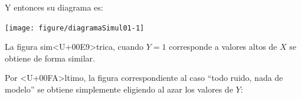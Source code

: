 \documentclass[10pt,a4paper]{article}
\begin{document}
\begin{knitrout}
\color{fgcolor}\begin{kframe}
\begin{alltt}
 \hlkwb{=}  \hlopt{>} \hlstd{,}  \hlstd{=} \hlstd{,}  \hlstd{=} \hlstd{)}
 \hlkwb{=}   
\end{alltt}
\end{kframe}
\end{knitrout}
Y entonces su diagrama es:
\begin{knitrout}
\color{fgcolor}\begin{kframe}
\begin{alltt}
 \hlkwb{=} \hlstd{()}
\hlstd{colores[datosSimul01}\hlopt{$} \hlopt{==} \hlstd{]} \hlkwb{=} 
\hlstd{colores[datosSimul01}\hlopt{$} \hlopt{==} \hlstd{]} \hlkwb{=} 
\hlopt{$}\hlopt{$}  \hlstd{=} \hlstd{,}   \hlstd{=}\hlstd{,}\hlstd{=}\hlstd{,}
      \hlstd{=} \hlstd{,}  \hlstd{=} \hlstd{,} \hlstd{=}\hlstd{, )}
\hlstd{(}\hlstd{,} \hlstd{(}\hlstd{,} \hlstd{),}  \hlstd{=} \hlstd{,}  \hlstd{=}  \hlstd{(}\hlstd{,} \hlstd{))}
\hlstd{(}\hlstd{=}\hlstd{)}
\end{alltt}
\end{kframe}

{\centering \texttt{[image: figure/diagramaSimul01-1]} 

}



\end{knitrout}
La figura sim<U+00E9>trica, cuando $Y=1$ corresponde a valores altos de $X$ se obtiene de forma similar.

Por <U+00FA>ltimo, la figura correspondiente al caso ``todo ruido, nada de modelo'' se obtiene simplemente eligiendo al azar los valores de $Y$:
\end{document}
